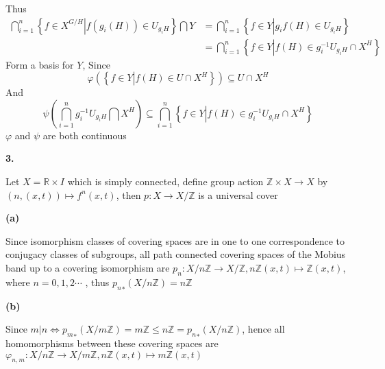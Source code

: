 \documentclass[../main.tex]{subfiles}
\begin{document}
Thus
\[
\begin{aligned}
\bigcap_{i=1}^n\left\{f\in X^{G/H}\left|f(g_i(H))\in U_{g_iH}\right.\right\}\bigcap Y
&=\bigcap_{i=1}^n\left\{f\in Y\left|g_if(H)\in U_{g_iH}\right.\right\} \\
&=\bigcap_{i=1}^n\left\{f\in Y\left|f(H)\in g_i^{-1}U_{g_iH}\cap X^H\right.\right\}
\end{aligned}
\]
Form a basis for $Y$, Since
\[
\varphi\left(\left\{f\in Y\left|f(H)\in U\cap X^H\right.\right\}\right)\subseteq U\cap X^H
\]
And
\[
\psi\left(\bigcap_{i=1}^n g_i^{-1}U_{g_iH}\bigcap X^H\right)\subseteq\bigcap_{i=1}^n\left\{f\in Y\left|f(H)\in g_i^{-1}U_{g_iH}\cap X^H\right.\right\}
\]
$\varphi$ and $\psi$ are both continuous \par
\textbf{3.} \par
Let $X=\mathbb{R}\times I$ which is simply connected, define group action $\mathbb{Z}\times X\rightarrow X$ by $(n,(x,t))\mapsto f^n(x,t)$, then $p:X\rightarrow X/\mathbb{Z}$ is a universal cover \par
\textbf{(a)} \par
Since isomorphism classes of covering spaces are in one to one correspondence to conjugacy classes of subgroups, all path connected covering spaces of the Mobius band up to a covering isomorphism are $p_n:X/n\mathbb{Z}\rightarrow X/\mathbb{Z}, n\mathbb{Z}(x,t)\mapsto \mathbb{Z}(x,t)$, where $n=0,1,2\cdots$ , thus ${p_n}_{*}(X/n\mathbb{Z})=n\mathbb{Z}$\par
\textbf{(b)} \par
Since $m|n \Leftrightarrow {p_m}_{*}(X/m\mathbb{Z})=m\mathbb{Z}\leq n\mathbb{Z}={p_n}_{*}(X/n\mathbb{Z})$, hence all homomorphisms between these covering spaces are $\varphi_{n,m}:X/n\mathbb{Z}\rightarrow X/m\mathbb{Z}, n\mathbb{Z}(x,t)\mapsto m\mathbb{Z}(x,t)$
\end{document}
